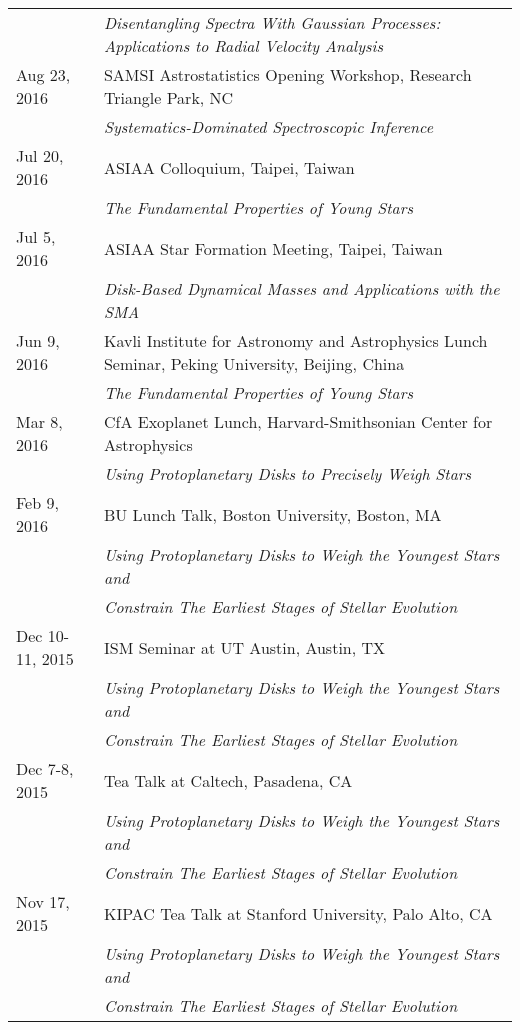\begin{longtable}{@{\hspace{10pt}}p{1.2in}l}
  & \emph{Disentangling Spectra With Gaussian Processes: Applications to Radial Velocity Analysis} \\[\rowskip]
  Aug 23, 2016 & SAMSI Astrostatistics Opening Workshop, Research Triangle Park, NC \\
  & \emph{Systematics-Dominated Spectroscopic Inference} \\[\rowskip]
  Jul 20, 2016 & ASIAA Colloquium, Taipei, Taiwan \\
  & \emph{The Fundamental Properties of Young Stars} \\[\rowskip]
  Jul 5, 2016 & ASIAA Star Formation Meeting, Taipei, Taiwan \\
  & \emph{Disk-Based Dynamical Masses and Applications with the SMA} \\[\rowskip]
  Jun 9, 2016 & Kavli Institute for Astronomy and Astrophysics Lunch Seminar, Peking University, Beijing, China \\
  & \emph{The Fundamental Properties of Young Stars} \\[\rowskip]
  Mar 8, 2016 & CfA Exoplanet Lunch, Harvard-Smithsonian Center for Astrophysics \\
  & \emph{Using Protoplanetary Disks to Precisely Weigh Stars} \\[\rowskip]
  Feb 9, 2016 & BU Lunch Talk, Boston University, Boston, MA \\
  & \emph{Using Protoplanetary Disks to Weigh the Youngest Stars and} \\
  & \emph{Constrain The Earliest Stages of Stellar Evolution} \\[\rowskip]
  Dec 10-11, 2015 & ISM Seminar at UT Austin, Austin, TX \\
  & \emph{Using Protoplanetary Disks to Weigh the Youngest Stars and} \\
  & \emph{Constrain The Earliest Stages of Stellar Evolution} \\[\rowskip]
  Dec 7-8, 2015 & Tea Talk at Caltech, Pasadena, CA \\
  & \emph{Using Protoplanetary Disks to Weigh the Youngest Stars and} \\
  & \emph{Constrain The Earliest Stages of Stellar Evolution} \\[\rowskip]
  Nov 17, 2015 & KIPAC Tea Talk at Stanford University, Palo Alto, CA \\
  & \emph{Using Protoplanetary Disks to Weigh the Youngest Stars and} \\
  & \emph{Constrain The Earliest Stages of Stellar Evolution} \\[\rowskip]

\end{longtable}
